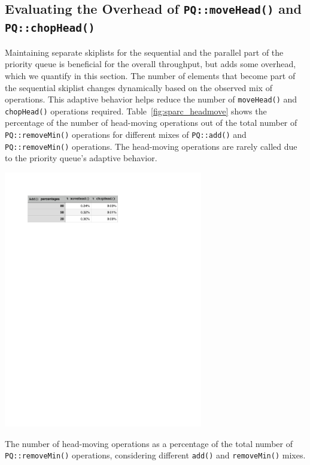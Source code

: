 \subsection{Evaluating the Overhead of \texttt{PQ::moveHead()} and \texttt{PQ::chopHead()}}
\label{Sec-Eval-Move}

Maintaining separate skiplists for the sequential and the parallel part of the priority queue is beneficial for the overall throughput, but adds some overhead, which we quantify in this section. 
The number of elements that become part of the sequential skiplist changes dynamically based on the observed mix of operations. This adaptive behavior helps reduce the number of \texttt{moveHead()} and \texttt{chopHead()} operations required.  
Table~\ref{fig:sparc_headmove} shows the percentage of the number of head-moving operations out of the total number of \texttt{PQ::removeMin()} operations for different mixes of \texttt{PQ::add()} and \texttt{PQ::removeMin()} operations. The head-moving operations are rarely called due to the priority queue's adaptive behavior. 

\begin{table}[htb]
  \centering
	\includegraphics[width=0.65\textwidth]{img/sparc-stats-headmove.pdf}
	\caption{The number of head-moving operations as a percentage of the total number of \texttt{PQ::removeMin()} operations, considering different \texttt{add()} and \texttt{removeMin()} mixes.}
\label{fig:sparc_headmove}
\end{table}
